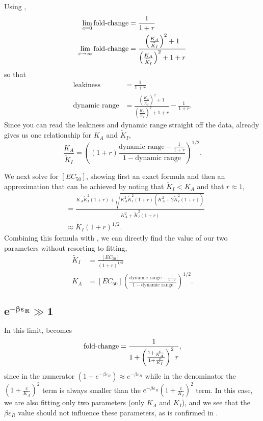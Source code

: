 Using \eref[AppendixSloppinessEq1], 
\begin{align}
\lim_{c = 0}\operatorname{fold-change} &= \frac{1}{1+r}\\
\lim_{c \to \infty}\operatorname{fold-change} &= \frac{\left(\frac{K_A}{\widetilde{K}_I}\right)^2 + 1}{\left(\frac{K_A}{\widetilde{K}_I}\right)^2 + 1+r}
\end{align}
so that
\begin{align}
\text{leakiness} &= \frac{1}{1+r} \label{AppendixSloppinessEq3} \\
\text{dynamic range} &= \frac{\left(\frac{K_A}{\widetilde{K}_I}\right)^2 + 1}{\left(\frac{K_A}{\widetilde{K}_I}\right)^2 + 1+r} - \frac{1}{1+r}. \label{AppendixSloppinessEq4}
\end{align}
Since you can read the leakiness and dynamic range straight off the data, \eref[AppendixSloppinessEq4] already gives us one relationship for $K_A$ and $\widetilde{K}_I$,
\begin{equation} \label{AppendixSloppinessEq5}
\frac{K_A}{\widetilde{K}_I} = \left( \left(1+r\right) \frac{\text{dynamic range} - \frac{1}{1+r}}{1-\text{dynamic range}} \right)^{1/2}.
\end{equation}

We next solve for $[EC_{50}]$, showing first an exact formula and then an approximation that can be achieved by noting that $\widetilde{K}_I < K_A$ and that $r \approx 1$,
\begin{align}
[EC_{50}] &= \frac{K_A \widetilde{K}_I^2 \left(1+r\right) + \sqrt{K_A^2 \widetilde{K}_I^2 \left(1+r\right) \left(K_A^2 + 2 \widetilde{K}_I^2 \left(1+r\right) \right)}}{K_A^2 + \widetilde{K}_I^2 \left(1+r\right)}\nonumber\\
&\approx \widetilde{K}_I \left(1+r\right)^{1/2}.
\end{align}
Combining this formula with \eref[AppendixSloppinessEq5], we can directly find the value of our two parameters without resorting to fitting,
\begin{align}
\widetilde{K}_I &= \frac{[EC_{50}]}{\left(1+r\right)^{1/2}}\\
K_A &= [EC_{50}] \left(\frac{\text{dynamic range} - \frac{1}{1+r}}{1-\text{dynamic range}} \right)^{1/2}.
\end{align}


\subsection{$\boldsymbol{e^{-\beta \varepsilon_R} \gg 1}$}

In this limit, \eref[AppendixSloppinessEq1] becomes 
\begin{equation}
\operatorname{fold-change} = \frac{1}{1+\left(\frac{1 + \frac{c}{K_A}}{1 + \frac{c}{K_I}}\right)^2 r},
\end{equation}
since in the numerator $\left( 1 + e^{-\beta \varepsilon_R} \right) \approx
e^{-\beta \varepsilon_R}$ while in the denominator the
$\left(1+\frac{c}{K_A}\right)^2$ term is always smaller than the $e^{-\beta
	\varepsilon_R} \left(1+\frac{c}{K_I}\right)^2$ term. In this case, we are also
fitting only two parameters (only $K_A$ and $K_I$), and we see that the $\beta
\varepsilon_R$ value should not influence these parameters, as is confirmed in
\fref[SIfig1].

